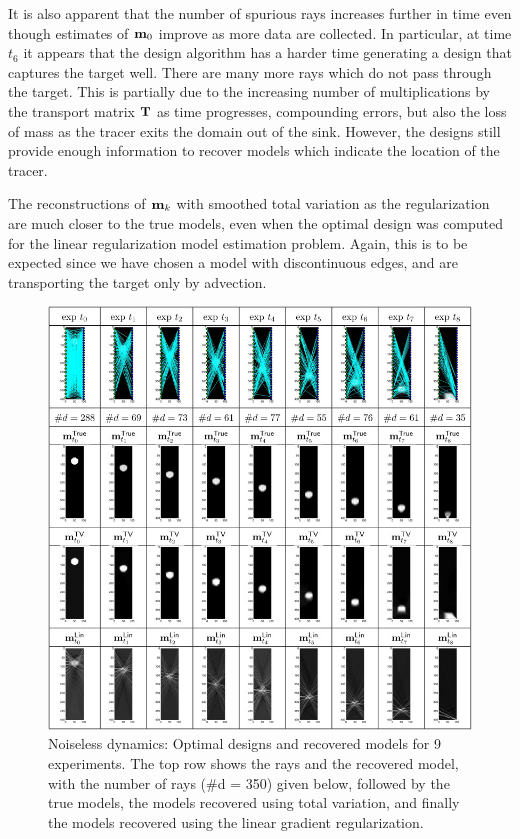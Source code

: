 \documentclass[11pt]{article}
\newcommand{\bfT}	{{\bf{T}}}
\newcommand{\bfm}	{{\bf{m}}}
\begin{document}
It is also apparent that the number of spurious rays increases further in time even though estimates of $\bfm_0$ improve as more data are collected. In particular, at time $t_6$ it appears that the design algorithm has a harder time generating a design that captures the target well. There are many more rays which do not pass through the target. This is partially due to the increasing number of multiplications by the transport matrix $\bfT$ as time progresses, compounding errors, but also the loss of mass as the tracer exits the domain out of the sink. However, the designs still provide enough information to recover models which indicate the location of the tracer.  

The reconstructions of $\bfm_k$ with smoothed total variation as the regularization are much closer to the true models, even when the optimal design was computed for the linear regularization model estimation problem. Again, this is to be expected since we have chosen a model with discontinuous edges, and are transporting the target only by advection. 
\begin{figure}
	\begin{center}
	\iwidth=170mm
	\includegraphics[width = 1\iwidth]{figures/noiselessFigs/noiselessResults}
	\end{center}
	\caption{Noiseless dynamics: Optimal designs and recovered models for 9 	experiments. The top row shows the rays and the recovered model, with 		the number of rays (\#d = 350) given below, followed by the true 			models, the models recovered using total variation, and finally the 		models recovered using the linear gradient regularization.}
	\label{fig:results1}
\end{figure}
\end{document}
